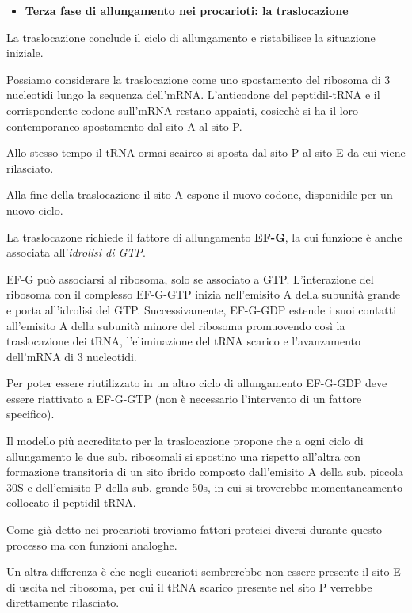 \documentclass[]{article}
\begin{document}
\begin{itemize}
\itemsep1pt\parskip0pt
\item
  \textbf{Terza fase di allungamento nei procarioti: la traslocazione}
\end{itemize}

La traslocazione conclude il ciclo di allungamento e ristabilisce la
situazione iniziale.

Possiamo considerare la traslocazione come uno spostamento del ribosoma
di 3 nucleotidi lungo la sequenza dell'mRNA. L'anticodone del
peptidil-tRNA e il corrispondente codone sull'mRNA restano appaiati,
cosicchè si ha il loro contemporaneo spostamento dal sito A al sito P.

Allo stesso tempo il tRNA ormai scairco si sposta dal sito P al sito E
da cui viene rilasciato.

Alla fine della traslocazione il sito A espone il nuovo codone,
disponidile per un nuovo ciclo.

La traslocazone richiede il fattore di allungamento \textbf{EF-G}, la
cui funzione è anche associata all'\emph{idrolisi di GTP}.

EF-G può associarsi al ribosoma, solo se associato a GTP. L'interazione
del ribosoma con il complesso EF-G-GTP inizia nell'emisito A della
subunità grande e porta all'idrolisi del GTP. Successivamente, EF-G-GDP
estende i suoi contatti all'emisito A della subunità minore del ribosoma
promuovendo così la traslocazione dei tRNA, l'eliminazione del tRNA
scarico e l'avanzamento dell'mRNA di 3 nucleotidi.

Per poter essere riutilizzato in un altro ciclo di allungamento EF-G-GDP
deve essere riattivato a EF-G-GTP (non è necessario l'intervento di un
fattore specifico).

Il modello più accreditato per la traslocazione propone che a ogni ciclo
di allungamento le due sub. ribosomali si spostino una rispetto
all'altra con formazione transitoria di un sito ibrido composto
dall'emisito A della sub. piccola 30S e dell'emisito P della sub. grande
50s, in cui si troverebbe momentaneamento collocato il peptidil-tRNA.

Come già detto nei procarioti troviamo fattori proteici diversi durante
questo processo ma con funzioni analoghe.

Un altra differenza è che negli eucarioti sembrerebbe non essere
presente il sito E di uscita nel ribosoma, per cui il tRNA scarico
presente nel sito P verrebbe direttamente rilasciato.
\end{document}
